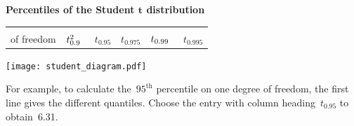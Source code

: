 \documentclass[a4paper]{article}
\begin{document}
\begin{center}
  {\Large\bf Percentiles of the Student $\mathbf{t}$ distribution}
\end{center}

\rule{0mm}{5mm}
\pagestyle{empty}
\thispagestyle{empty}
\begin{table}[ht]
\centering
\begin{tabular}{r|ccccc}
  \begin{minipage}{20mm}degrees\\of freedom\end{minipage}
  & \begin{minipage}{1.3cm}\hfill{\Large $t^2_{0.9\hphantom{9}}$}\hfill\end{minipage}
  & \begin{minipage}{1.3cm}\hfill{\Large $t_{0.95}             $}\hfill\end{minipage}
  & \begin{minipage}{1.3cm}\hfill{\Large $t_{0.975}            $}\hfill\end{minipage}
  & \begin{minipage}{1.3cm}\hfill{\Large $t_{0.99\hphantom{9}} $}\hfill\end{minipage}
  & \begin{minipage}{1.3cm}\hfill{\Large $t_{0.995}            $}\hfill\end{minipage}
  \rule[-4mm]{0mm}{10mm}
  \\  \hline

  \hline
\end{tabular}
\end{table}

\begin{centering}
\texttt{[image: student\_diagram.pdf]}
\end{centering}

\noindent For example, to calculate the~$95^\mathrm{th}$ percentile on
one degree of freedom, the first line gives the different quantiles.
Choose the entry with column heading~$t_{0.95}$ to obtain~6.31.

\end{document}
